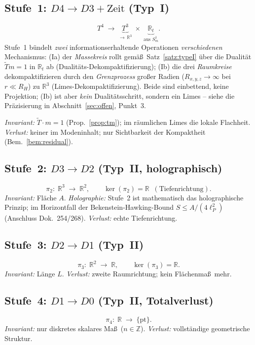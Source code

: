 \subsection{Stufe~1: $D4 \to D3 + \text{Zeit}$ (Typ~I)}
\[
  T^4 \;\longrightarrow\; \underbrace{T^3}_{\to\,\mathbb{R}^3}
  \;\times\; \underbrace{\mathbb{R}_t}_{\text{aus } S^1_m}.
\]
Stufe~1 b\"undelt \emph{zwei} informationserhaltende Operationen \emph{verschiedenen}
Mechanismus: (Ia) der \emph{Massekreis} rollt gem\"a\ss\ Satz~\ref{satz:typeI} \"uber
die Dualit\"at $\tilde T m=1$ in $\mathbb{R}_t$ ab (Dualit\"ats-Dekompaktifizierung);
(Ib) die drei \emph{Raumkreise} dekompaktifizieren durch den \emph{Grenzprozess}
gro\ss er Radien ($R_{x,y,z}\to\infty$ bei $r\ll R_H$) zu $\mathbb{R}^3$
(Limes-Dekompaktifizierung). Beide sind einbettend, keine Projektion; (Ib) ist aber
\emph{kein} Dualit\"atsschritt, sondern ein Limes -- siehe die Pr\"azisierung in
Abschnitt~\ref{sec:offen}, Punkt~3.

\textit{Invariant:} $\tilde{T}\cdot m = 1$ (Prop.~\ref{prop:tm}); im r\"aumlichen
Limes die lokale Flachheit.\quad
\textit{Verlust:} keiner im Modeninhalt; nur Sichtbarkeit der Kompaktheit
(Bem.~\ref{bem:residual}).

\subsection{Stufe~2: $D3 \to D2$ (Typ~II, holographisch)}
\[
  \pi_2:\; \mathbb{R}^3 \;\longrightarrow\; \mathbb{R}^2,
  \qquad \ker(\pi_2) = \mathbb{R}\;\;(\text{Tiefenrichtung}).
\]
\textit{Invariant:} Fl\"ache $A$.\quad
\textit{Holographie:} Stufe~2 ist mathematisch das holographische Prinzip; im
Horizontfall der Bekenstein-Hawking-Bound $S \le A/(4\ell_P^2)$ (Anschluss
Dok.~254/268).\quad
\textit{Verlust:} echte Tiefenrichtung.

\subsection{Stufe~3: $D2 \to D1$ (Typ~II)}
\[
  \pi_3:\; \mathbb{R}^2 \;\longrightarrow\; \mathbb{R},
  \qquad \ker(\pi_3) = \mathbb{R}.
\]
\textit{Invariant:} L\"ange $L$.\quad
\textit{Verlust:} zweite Raumrichtung; kein Fl\"achenma\ss\ mehr.

\subsection{Stufe~4: $D1 \to D0$ (Typ~II, Totalverlust)}
\[
  \pi_4:\; \mathbb{R} \;\longrightarrow\; \{\mathrm{pt}\}.
\]
\textit{Invariant:} nur diskretes skalares Ma\ss\ ($n\in\mathbb{Z}$).\quad
\textit{Verlust:} vollst\"andige geometrische Struktur.


